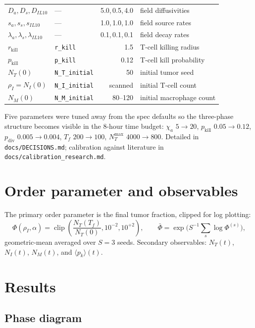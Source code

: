 \documentclass[11pt,letterpaper]{article}
\begin{document}
\begin{center}
\begin{tabular}{l l r l}
$D_a, D_s, D_{IL10}$ & --- & 5.0,\,0.5,\,4.0 & field diffusivities \\
$s_a, s_s, s_{IL10}$ & --- & 1.0,\,1.0,\,1.0 & field source rates \\
$\lambda_a, \lambda_s, \lambda_{IL10}$ & --- & 0.1,\,0.1,\,0.1 & field decay rates \\
\midrule
$r_{\text{kill}}$ & \texttt{r\_kill}   & 1.5      & T-cell killing radius \\
$p_{\text{kill}}$ & \texttt{p\_kill}   & 0.12     & T-cell kill probability \\
\midrule
$N_T(0)$       & \texttt{N\_T\_initial}& 50       & initial tumor seed \\
$\rho_I = N_I(0)$ & \texttt{N\_I\_initial} & scanned & initial T-cell count \\
$N_M(0)$       & \texttt{N\_M\_initial}& 80--120  & initial macrophage count \\
\bottomrule
\end{tabular}
\end{center}

Five parameters were tuned away from the spec defaults so the
three-phase structure becomes visible in the 8-hour time budget:
$\chi_a$ $5\to 20$, $p_{\text{kill}}$ $0.05 \to 0.12$, $p_{\text{div}}$
$0.005 \to 0.004$, $T_f$ $200 \to 100$, $N_T^{\max}$ $4000 \to 800$.
Detailed in \texttt{docs/DECISIONS.md}; calibration against
literature in \texttt{docs/calibration\_research.md}.

\section{Order parameter and observables}

The primary order parameter is the final tumor fraction, clipped for
log plotting:
\begin{equation}
\Phi(\rho_I, \alpha) =
  \operatorname{clip}\!\left(\frac{N_T(T_f)}{N_T(0)}, 10^{-2}, 10^{+2}\right),
\qquad
\bar\Phi = \exp\!\big(S^{-1}\textstyle\sum_s \log \Phi^{(s)}\big),
\end{equation}
geometric-mean averaged over $S = 3$ seeds. Secondary observables:
$N_T(t)$, $N_I(t)$, $N_M(t)$, and $\langle p_k\rangle(t)$.

\section{Results}
\label{sec:m1-results}

\subsection{Phase diagram}
\end{document}
